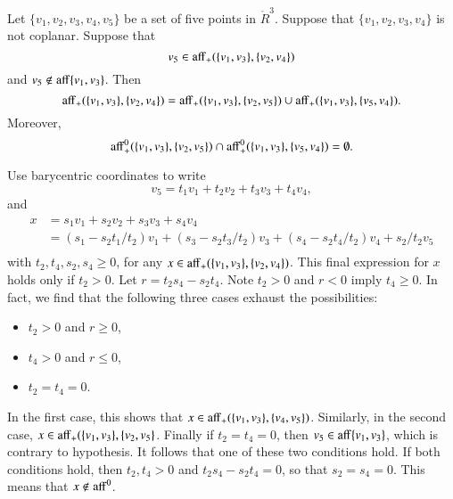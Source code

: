 \begin{tarskidata}
\begin{tarski}

\begin{lemma}
Let $\{v_1,v_2,v_3,v_4,v_5\}$ be a set of five
points in $\ring{R}^3$.  Suppose that $\{v_1,v_2,v_3,v_4\}$ is
not coplanar.  Suppose that 
    $$v_5\in {\operatorname{aff}}_+(\{v_1,v_3\},\{v_2,v_4\})$$
and $v_5\not\in{\operatorname{aff}}\{v_1,v_3\}$.
Then 
    $$
    {\operatorname{aff}}_+(\{v_1,v_3\},\{v_2,v_4\}) = 
{\operatorname{aff}}_+(\{v_1,v_3\},\{v_2,v_5\}) \cup
{\operatorname{aff}}_+(\{v_1,v_3\},\{v_5,v_4\}).
    $$
Moreover,
   $$
{\operatorname{aff}}^0_+(\{v_1,v_3\},\{v_2,v_5\}) \cap
{\operatorname{aff}}^0_+(\{v_1,v_3\},\{v_5,v_4\}) =\emptyset .
   $$
\end{lemma}

\begin{proved}
Use barycentric coordinates to write
   $$
   v_5 = t_1 v_1 + t_2 v_2 + t_3 v_3 + t_4 v_4,
   $$
and 
    $$
    \begin{array}{lll}
    x &= s_1 v_1 + s_2 v_2 + s_3 v_3 + s_4 v_4 \\
      &= (s_1 - s_2 t_1/t_2) v_1 + (s_3 - s_2 t_3/t_2) v_3 +
        (s_4 - s_2 t_4/t_2) v_4 + s_2/t_2 v_5\\
    \end{array}
    $$
with $t_2,t_4,s_2,s_4\ge 0$,
for any $x\in{\operatorname{aff}}_+(\{v_1,v_3\},\{v_2,v_4\})$. 
This final expression for $x$ holds only if $t_2>0$. 
Let $r=t_2s_4-s_2t_4$.  
Note $t_2>0$ and $r<0$ imply $t_4\ge0$. In fact, we find that the following
three cases exhaust the possibilities:
\begin{itemize}
\item $t_2>0$ and $r\ge 0$,
\item $t_4>0$ and $r\le 0$,
\item $t_2=t_4=0$.
\end{itemize}
In the first case, this shows that 
$x\in{\operatorname{aff}}_+(\{v_1,v_3\},\{v_4,v_5\})$.
Similarly, in the second case,
$x\in{\operatorname{aff}}_+(\{v_1,v_3\},\{v_2,v_5\}$.
Finally if $t_2=t_4=0$, then $v_5\in{\operatorname{aff}}\{v_1,v_3\}$, which is
contrary to hypothesis.  It follows that one of these two
conditions hold.  If both conditions hold, then $t_2,t_4>0$
and $t_2 s_4 - s_2 t_4 =0$, so that $s_2=s_4 = 0$.  This means
that $x\not\in{\operatorname{aff}}^0$.
\swallowed\end{proved}
\end{tarski}






\end{tarskidata}

